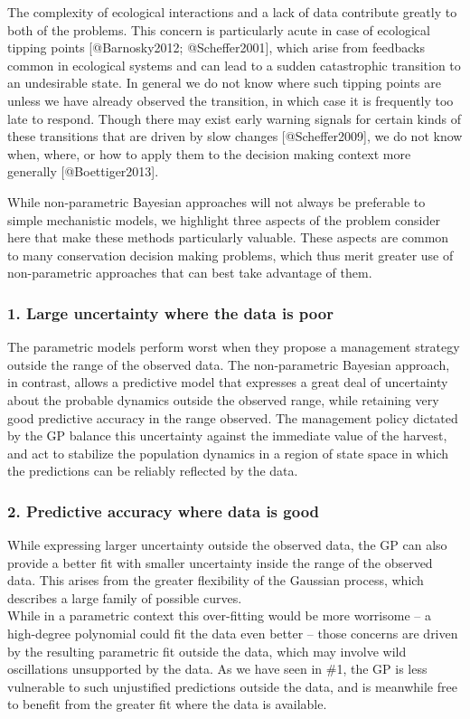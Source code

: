 \documentclass[author-year, review]{elsarticle} %
\begin{document}
The complexity of ecological interactions and a lack of data contribute
greatly to both of the problems. This concern is particularly acute in
case of ecological tipping points {[}@Barnosky2012; @Scheffer2001{]},
which arise from feedbacks common in ecological systems and can lead to
a sudden catastrophic transition to an undesirable state. In general we
do not know where such tipping points are unless we have already
observed the transition, in which case it is frequently too late to
respond. Though there may exist early warning signals for certain kinds
of these transitions that are driven by slow changes
{[}@Scheffer2009{]}, we do not know when, where, or how to apply them to
the decision making context more generally {[}@Boettiger2013{]}.

While non-parametric Bayesian approaches will not always be preferable
to simple mechanistic models, we highlight three aspects of the problem
consider here that make these methods particularly valuable. These
aspects are common to many conservation decision making problems, which
thus merit greater use of non-parametric approaches that can best take
advantage of them.

\subsubsection{1. Large uncertainty where the data is poor}

The parametric models perform worst when they propose a management
strategy outside the range of the observed data. The non-parametric
Bayesian approach, in contrast, allows a predictive model that expresses
a great deal of uncertainty about the probable dynamics outside the
observed range, while retaining very good predictive accuracy in the
range observed. The management policy dictated by the GP balance this
uncertainty against the immediate value of the harvest, and act to
stabilize the population dynamics in a region of state space in which
the predictions can be reliably reflected by the data.

\subsubsection{2. Predictive accuracy where data is good}

While expressing larger uncertainty outside the observed data, the GP
can also provide a better fit with smaller uncertainty inside the range
of the observed data. This arises from the greater flexibility of the
Gaussian process, which describes a large family of possible
curves.\\While in a parametric context this over-fitting would be more
worrisome -- a high-degree polynomial could fit the data even better --
those concerns are driven by the resulting parametric fit outside the
data, which may involve wild oscillations unsupported by the data. As we
have seen in \#1, the GP is less vulnerable to such unjustified
predictions outside the data, and is meanwhile free to benefit from the
greater fit where the data is available.
\end{document}
